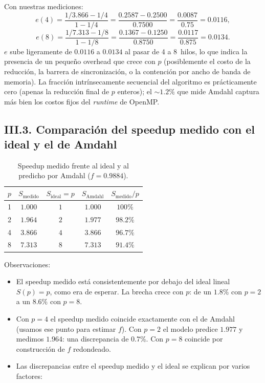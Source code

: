 \documentclass[12pt,a4paper]{article}
\begin{document}
Con nuestras mediciones:
\[
e(4) = \frac{1/3.866 - 1/4}{1 - 1/4}
     = \frac{0.2587 - 0.2500}{0.7500}
     = \frac{0.0087}{0.75}
     = 0.0116,
\]
\[
e(8) = \frac{1/7.313 - 1/8}{1 - 1/8}
     = \frac{0.1367 - 0.1250}{0.8750}
     = \frac{0.0117}{0.875}
     = 0.0134.
\]
$e$ sube ligeramente de $0.0116$ a $0.0134$ al pasar de 4 a 8~hilos, lo que indica la presencia de un peque\~no overhead que crece con $p$ (posiblemente el costo de la reducci\'on, la barrera de sincronizaci\'on, o la contenci\'on por ancho de banda de memoria). La fracci\'on intr\'insecamente secuencial del algoritmo es pr\'acticamente cero (apenas la reducci\'on final de $p$ enteros); el ${\sim}1.2\%$ que mide Amdahl captura m\'as bien los costos fijos del \emph{runtime} de OpenMP.

\subsection*{III.3. Comparaci\'on del speedup medido con el ideal y el de Amdahl}

\begin{table}[ht]
  \centering
  \caption{Speedup medido frente al ideal y al predicho por Amdahl ($f=0.9884$).}
  \label{tab:speedup-comp}
  \begin{tabular}{rcccc}
    \toprule
    $p$ & $S_{\mathrm{medido}}$ & $S_{\mathrm{ideal}}=p$ & $S_{\mathrm{Amdahl}}$ & $S_{\mathrm{medido}}/p$ \\
    \midrule
    1 & $1.000$ & $1$   & $1.000$ & $100\%$ \\
    2 & $1.964$ & $2$   & $1.977$ & $98.2\%$ \\
    4 & $3.866$ & $4$   & $3.866$ & $96.7\%$ \\
    8 & $7.313$ & $8$   & $7.313$ & $91.4\%$ \\
    \bottomrule
  \end{tabular}
\end{table}

\noindent Observaciones:
\begin{itemize}
  \item El speedup medido est\'a consistentemente por debajo del ideal lineal $S(p)=p$, como era de esperar. La brecha crece con $p$: de un $1.8\%$ con $p=2$ a un $8.6\%$ con $p=8$.

  \item Con $p=4$ el speedup medido coincide exactamente con el de Amdahl (usamos ese punto para estimar $f$). Con $p=2$ el modelo predice $1.977$ y medimos $1.964$: una discrepancia de $0.7\%$. Con $p=8$ coincide por construcci\'on de $f$ redondeado.

  \item Las discrepancias entre el speedup medido y el ideal se explican por varios factores:
\end{itemize}
\end{document}

